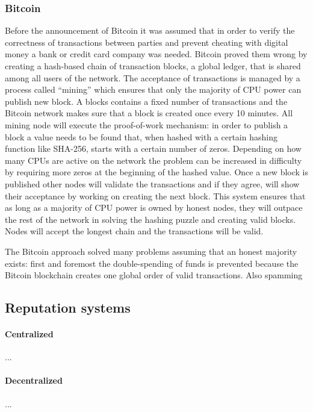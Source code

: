 \subsubsection{Bitcoin}
Before the announcement of Bitcoin it was assumed that in order to verify the correctness of 
transactions between parties and prevent cheating with digital money a bank or credit card company
was needed. Bitcoin proved them wrong by creating a hash-based chain of transaction blocks, a global 
ledger, that is shared among all users of the network. The acceptance of transactions is managed by 
a process called ``mining'' which ensures that only the majority of CPU power can publish new 
block. A blocks contains a fixed number of transactions and the Bitcoin network makes sure that a
block is created once every 10 minutes. All mining node will execute the proof-of-work mechanism: 
in order to publish a block a value needs to be found that, when hashed with a certain hashing 
function like SHA-256, starts with a certain number of zeros. Depending on how many CPUs are active
on the network the problem can be increased in difficulty by requiring more zeros at the beginning 
of the hashed value. Once a new block is published other nodes will validate the transactions and 
if they agree, will show their acceptance by working on creating the next block. This system ensures
that as long as a majority of CPU power is owned by honest nodes, they will outpace the rest of the
network in solving the hashing puzzle and creating valid blocks. Nodes will accept the longest chain
and the transactions will be valid.

The Bitcoin approach solved many problems assuming that an honest majority exists: first and 
foremost the double-spending of funds is prevented because the Bitcoin blockchain creates one global
order of valid transactions. Also spamming 

\subsection{Reputation systems}


\paragraph{Centralized} ...

\paragraph{Decentralized} ...

